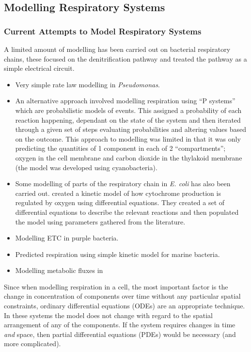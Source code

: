 \subsection{Modelling Respiratory Systems}

\subsubsection{Current Attempts to Model Respiratory Systems}
A limited amount of modelling has been carried out on bacterial respiratory chains, these focused on the denitrification pathway and treated the pathway as a simple electrical circuit\cite{Almeida1997}.

\begin{itemize}
 \item Very simple rate law modelling in \textit{Pseudomonas}\cite{Jin2003}.
 \item An alternative approach involved modelling respiration using ``P systems'' which are probabilistic models of events. This assigned a probability of each reaction happening, dependant on the state of the system and then iterated through a given set of steps evaluating probabilities and altering values based on the outcome\cite{Cavaliere2006}. This approach to modelling was limited in that it was only predicting the quantities of 1 component in each of 2 ``compartments''; oxygen in the cell membrane and carbon dioxide in the thylakoid membrane (the model was developed using cyanobacteria).
 \item Some modelling of parts of the respiratory chain in \textit{E. coli} has also been carried out. \citet{Peercy2006} created a kinetic model of how cytochrome production is regulated by oxygen using differential equations. They created a set of differential equations to describe the relevant reactions and then populated the model using parameters gathered from the literature.
 \item Modelling ETC in purple bacteria\cite{Klamt2008}.
 \item Predicted respiration using simple kinetic model for marine bacteria\cite{Aguiar-Gonzalez2012}.
 \item Modelling metabolic fluxes in \Nsm{} \cite{Baart2007}

\end{itemize}

Since when modelling respiration in a cell, the most important factor is the change in concentration of components over time without any particular spatial constraints, ordinary differential equations (ODEs) are an appropriate technique. In these systems the model does not change with regard to the spatial arrangement of any of the components. If the system requires changes in time \textit{and} space, then partial differential equations (PDEs) would be necessary (and more complicated)\cite{Klipp2005}.


